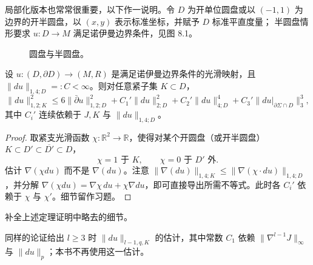 局部化版本也常常很重要，以下作一说明。令 $D$ 为开单位圆盘或以
$(-1,1)$ 为边界的开半圆盘，以 $(x,y)$ 表示标准坐标，并赋予 $D$ 标准平直度量；
半圆盘情形要求 $u:D\to M$ 满足诺伊曼边界条件，见图 8.1。
\begin{figure}[htbp]
\centering
{}
\caption{圆盘与半圆盘。}
\label{fig:ch8-disc-and-semidisc}
\end{figure}

\begin{theorem}\label{thm:ch8-localized-off-shell-estimate}
设 $u:(D,\partial D)\to(M,R)$ 是满足诺伊曼边界条件的光滑映射，且
$\|du\|_{1,4;D}=:C<\infty$。则对任意紧子集 $K\subset D$，
\[
 \|du\|_{1,2;K}^2\leq6\|\bar\partial u\|_{1,2;D}^2
 +C_1'\|du\|_{2;D}^2+C_2'\|du\|_{4;D}^4
 +C_3'\|du|_{\partial\Sigma\cap D}\|_{3}^3,
\]
其中 $C_i'$ 连续依赖于 $J,K$ 与 $\|du\|_{1,4;D}$。
\end{theorem}
\begin{proof}
取紧支光滑函数 $\chi:\mathbb R^2\to\mathbb R$，使得对某个开圆盘（或开半圆盘）
$K\subset D'\subset\overline{D'}\subset D$，
\[
 \chi=1\text{ 于 }K,\qquad \chi=0\text{ 于 }D'\text{ 外}.
\]
估计 $\nabla(\chi du)$ 而不是 $\nabla(du)$。注意
$\|\nabla(du)\|_{1,4;K}\leq\|\nabla(\chi\cdot du)\|_{1,4;D}$，并分解
$\nabla(\chi du)=\nabla\chi\,du+\chi\nabla du$，即可直接导出所需不等式。此时各
$C_i'$ 依赖于 $\chi$ 与 $\chi'$。细节留作习题。
\end{proof}

\begin{exercise}\label{ex:ch8-complete-localized-estimate}
补全上述定理证明中略去的细节。
\end{exercise}

\begin{remark}\label{rem:ch8-higher-off-shell-estimate}
同样的论证给出 $l\geq3$ 时 $\|du\|_{l-1,q,K}$ 的估计，其中常数 $C_1$ 依赖
$\|\nabla^{l-1}J\|_\infty$ 与 $\|du\|_p$；本书不再使用这一估计。
\end{remark}
